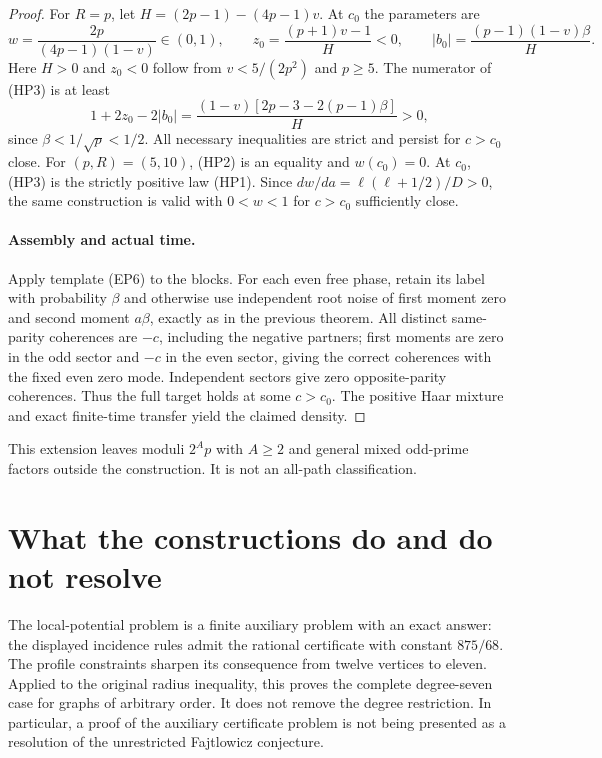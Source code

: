 \documentclass[11pt,a4paper]{article}
\theoremstyle{definition}\newtheorem{definition}[theorem]{Definition}
\theoremstyle{remark}\newtheorem{remark}[theorem]{Remark}
\begin{document}
\begin{proof}
For $R=p$, let $H=(2p-1)-(4p-1)v$. At $c_0$ the parameters are
\[
 w=\frac{2p}{(4p-1)(1-v)}\in(0,1),\qquad
 z_0=\frac{(p+1)v-1}{H}<0,\qquad
 |b_0|=\frac{(p-1)(1-v)\beta}{H}.
\]
Here $H>0$ and $z_0<0$ follow from $v<5/(2p^2)$ and $p\ge5$.
The numerator of (HP3) is at least
\[
 1+2z_0-2|b_0|
 =\frac{(1-v)[2p-3-2(p-1)\beta]}H>0,
\]
since $\beta<1/\sqrt p<1/2$. All necessary inequalities are
strict and persist for $c>c_0$ close.
For $(p,R)=(5,10)$, (HP2) is an equality and $w(c_0)=0$.
At $c_0$, (HP3) is the strictly positive law (HP1). Since
$dw/da=\ell(\ell+1/2)/D>0$, the same construction is valid
with $0<w<1$ for $c>c_0$ sufficiently close.

\paragraph{Assembly and actual time.}
Apply template (EP6) to the blocks. For each even free phase,
retain its label with probability $\beta$ and otherwise use
independent root noise of first moment zero and second moment
$a\beta$, exactly as in the previous theorem. All distinct
same-parity coherences are $-c$, including the negative partners;
first moments are zero in the odd sector and $-c$ in the even
sector, giving the correct coherences with the fixed even zero
mode. Independent sectors give zero opposite-parity coherences.
Thus the full target holds at some $c>c_0$. The positive Haar
mixture and exact finite-time transfer yield the claimed density.
\end{proof}

This extension leaves moduli $2^A p$ with $A\ge2$ and general
mixed odd-prime factors outside the construction. It is not an
all-path classification.


\section{What the constructions do and do not resolve}

The local-potential problem is a finite auxiliary problem with an exact
answer: the displayed incidence rules admit the rational certificate
with constant $875/68$. The profile constraints sharpen its consequence
from twelve vertices to eleven. Applied to the original radius
inequality, this proves the complete degree-seven case for graphs of
arbitrary order. It does not remove the degree restriction. In
particular, a proof of the auxiliary certificate problem is not being
presented as a resolution of the unrestricted Fajtlowicz conjecture.
\end{document}
